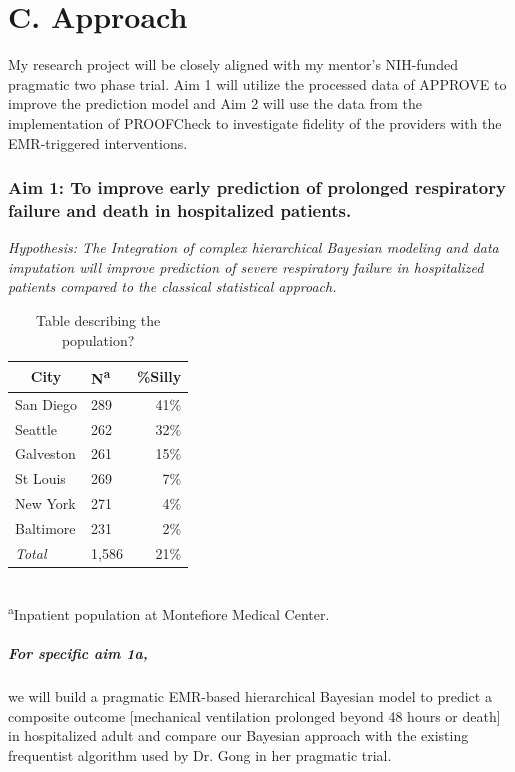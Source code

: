 \documentclass[11pt,notitlepage]{article}
\begin{document}
\section*{C. Approach}
My research project will be closely aligned with my mentor's NIH-funded pragmatic two phase trial. Aim 1 will utilize the processed data of APPROVE to improve the prediction model and Aim 2 will use the data from the implementation of PROOFCheck to investigate fidelity of the providers with the EMR-triggered interventions.

\subsubsection*{Aim 1: To improve early prediction of prolonged respiratory failure and death in hospitalized patients.}

\begin{flushleft}
\textit{Hypothesis: The Integration of complex hierarchical Bayesian modeling and data imputation will improve prediction of severe respiratory failure in hospitalized patients compared to the classical statistical approach.}
\end{flushleft}

\begin{table} %
\caption{Table describing the population?}
\begin{center}
\begin{tabular}{l l r}
\toprule
\multicolumn{1}{c}{City} & {N\textsuperscript{a}} & {\%Silly}\\
\midrule
San Diego & 289 & 41\%\\
Seattle & 262 & 32\%\\
Galveston & 261 & 15\%\\
St Louis & 269 & 7\%\\
New York & 271 & 4\%\\
Baltimore & 231 & 2\%\\
\emph{Total} & 1,586 & 21\%\\
\hline
\end{tabular}\\
\footnotesize\textsuperscript{a}{Inpatient population at Montefiore Medical Center.}
\end{center}
\label{default}
\end{table}

\subparagraph*{For specific aim 1a,} we will build a pragmatic EMR-based hierarchical Bayesian model to predict a composite outcome [mechanical ventilation prolonged beyond 48 hours or death] in hospitalized adult and compare our Bayesian approach with the existing frequentist algorithm used by Dr. Gong in her pragmatic trial.
\end{document}
